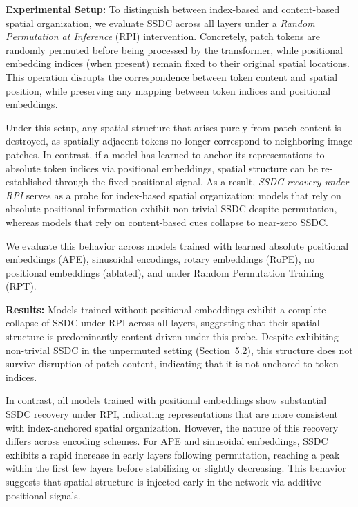 \documentclass{article}
\begin{document}
    \textbf{Experimental Setup:}
    To distinguish between index-based and content-based spatial organization, we evaluate SSDC across all layers under a \emph{Random Permutation at Inference} (RPI) intervention. Concretely, patch tokens are randomly permuted before being processed by the transformer, while positional embedding indices (when present) remain fixed to their original spatial locations. This operation disrupts the correspondence between token content and spatial position, while preserving any mapping between token indices and positional embeddings.

    Under this setup, any spatial structure that arises purely from patch content is destroyed, as spatially adjacent tokens no longer correspond to neighboring image patches. In contrast, if a model has learned to anchor its representations to absolute token indices via positional embeddings, spatial structure can be re-established through the fixed positional signal. As a result, \emph{SSDC recovery under RPI} serves as a probe for index-based spatial organization: models that rely on absolute positional information exhibit non-trivial SSDC despite permutation, whereas models that rely on content-based cues collapse to near-zero SSDC.

    We evaluate this behavior across models trained with learned absolute positional embeddings (APE), sinusoidal encodings, rotary embeddings (RoPE), no positional embeddings (ablated), and under Random Permutation Training (RPT).

    \textbf{Results:}
    Models trained without positional embeddings exhibit a complete collapse of SSDC under RPI across all layers, suggesting that their spatial structure is predominantly content-driven under this probe. Despite exhibiting non-trivial SSDC in the unpermuted setting (Section~5.2), this structure does not survive disruption of patch content, indicating that it is not anchored to token indices.

    In contrast, all models trained with positional embeddings show substantial SSDC recovery under RPI, indicating representations that are more consistent with index-anchored spatial organization. However, the nature of this recovery differs across encoding schemes. For APE and sinusoidal embeddings, SSDC exhibits a rapid increase in early layers following permutation, reaching a peak within the first few layers before stabilizing or slightly decreasing. This behavior suggests that spatial structure is injected early in the network via additive positional signals.
\end{document}
